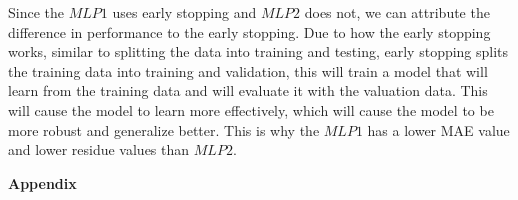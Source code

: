 \documentclass[12pt]{article}
\begin{document}
\begin{enumerate}[leftmargin=\labelsep,resume]
          Since the $MLP1$ uses early stopping and $MLP2$ does not, we can
          attribute the difference in performance to the early stopping.
          Due to how the early stopping works, similar to splitting the data
          into training and testing, early stopping splits the training data
          into training and validation, this will train a model that will
          learn from the training data and will evaluate it with the valuation data.
          This will cause the model to learn more effectively, which will cause
          the model to be more robust and generalize better.
          This is why the $MLP1$ has a lower MAE value and lower residue values than $MLP2$.

\end{enumerate}

\pagebreak

\center\large{\textbf{Appendix}\vskip 0.3cm}



\vspace*{1.5cm}



\vspace*{1.5cm}


\end{document}
